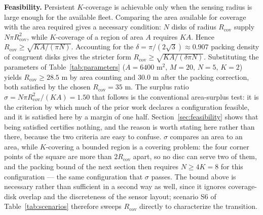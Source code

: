 \documentclass[conference]{IEEEtran}
\begin{document}
\medskip
\noindent\textbf{Feasibility.} Persistent $K$-coverage is achievable only when the sensing radius is large enough for the available fleet. Comparing the area available for coverage with the area required gives a necessary condition: $N$ disks of radius $R_{\mathrm{cov}}$ supply $N\pi R_{\mathrm{cov}}^{2}$, while $K$-coverage of a region of area $A$ requires $KA$. Hence $R_{\mathrm{cov}} \ge \sqrt{KA/(\pi N)}$. Accounting for the $\delta = \pi/(2\sqrt{3}) \approx 0.907$ packing density of congruent disks gives the stricter form $R_{\mathrm{cov}} \ge \sqrt{KA/(\delta\pi N)}$. Substituting the parameters of Table~\ref{tab:parameters} ($A = 6400$ m$^2$, $M = 20$, $N = 5$, $K = 2$) yields $R_{\mathrm{cov}} \ge 28.5$ m by area counting and $30.0$ m after the packing correction, both satisfied by the chosen $R_{\mathrm{cov}} = 35$ m. The surplus ratio $\sigma = N\pi R_{\mathrm{cov}}^{2}/(KA) = 1.50$ that follows is the conventional area-surplus test: it is the criterion by which much of the prior work declares a configuration feasible, and it is satisfied here by a margin of one half. Section~\ref{sec:feasibility} shows that being satisfied certifies nothing, and the reason is worth stating here rather than there, because the two criteria are easy to confuse. $\sigma$ compares an area to an area, while $K$-covering a bounded region is a covering problem: the four corner points of the square are more than $2R_{\mathrm{cov}}$ apart, so no disc can serve two of them, and the packing bound of the next section then requires $N \ge 4K = 8$ for this configuration --- the same configuration that $\sigma$ passes. The bound above is necessary rather than sufficient in a second way as well, since it ignores coverage-disk overlap and the discreteness of the sensor layout; scenario S6 of Table~\ref{tab:scenarios} therefore sweeps $R_{\mathrm{cov}}$ directly to characterize the transition.
\end{document}
